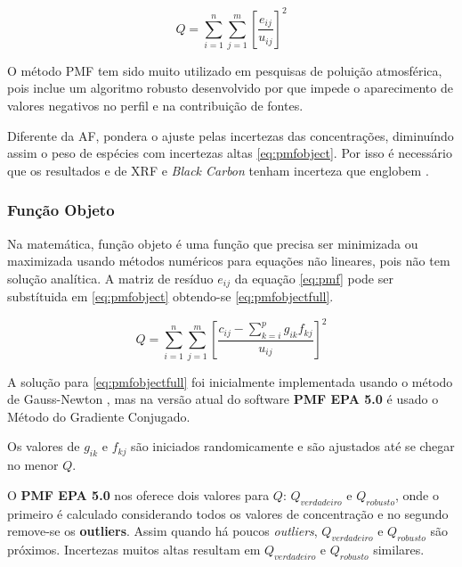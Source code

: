 \begin{equation}
  Q = \sum_{i=1}^n \sum_{j=1}^m  \left[ \frac{e_{ij}} {u_{ij}} \right] ^2
  \label{eq:pmfobject}
\end{equation}

O método PMF tem sido muito utilizado em pesquisas de poluição 
atmosférica, pois inclue um algoritmo robusto desenvolvido por \citep{paatero1994}
que impede o aparecimento de valores negativos no perfil e na contribuição de fontes.

Diferente da AF, pondera o ajuste pelas incertezas das concentrações, 
diminuíndo assim o peso de espécies com incertezas altas \ref{eq:pmfobject}.
Por isso é necessário que os resultados e de XRF e \textit{Black Carbon}
tenham incerteza que englobem .

\subsubsection{Função Objeto}

Na matemática, função objeto é uma função que precisa ser minimizada 
ou maximizada usando métodos numéricos para equações não lineares, pois não 
tem solução analítica. A matriz de resíduo ${e_{ij}}$ da equação \ref{eq:pmf}
pode ser substítuida em \ref{eq:pmfobject} obtendo-se \ref{eq:pmfobjectfull}.

\begin{equation}
  Q = \sum_{i=1}^n \sum_{j=1}^m  \left[ \frac{c_{ij} - \sum_{k=i}^p g_{ik}f_{kj}} {u_{ij}} \right] ^2
  \label{eq:pmfobjectfull}
\end{equation}

A solução para \ref{eq:pmfobjectfull} foi inicialmente implementada usando 
o método de Gauss-Newton \citep{paatero1994}, mas na 
versão atual do software \textbf{PMF EPA 5.0} \citep{norris2014} é usado o Método do Gradiente Conjugado.

Os valores de $g_{ik}$ e $f_{kj}$ são iniciados randomicamente e
são ajustados até se chegar no menor $Q$.
 
O \textbf{PMF EPA 5.0} nos oferece dois valores para $Q$: $Q_{verdadeiro}$ e 
$Q_{robusto}$, onde o primeiro é calculado considerando todos os valores 
de concentração e no segundo remove-se os \textbf{outliers}.
Assim quando há poucos \textit{outliers}, $Q_{verdadeiro}$ e $Q_{robusto}$ 
são próximos. Incertezas muitos altas resultam em $Q_{verdadeiro}$ e 
$Q_{robusto}$ similares.


